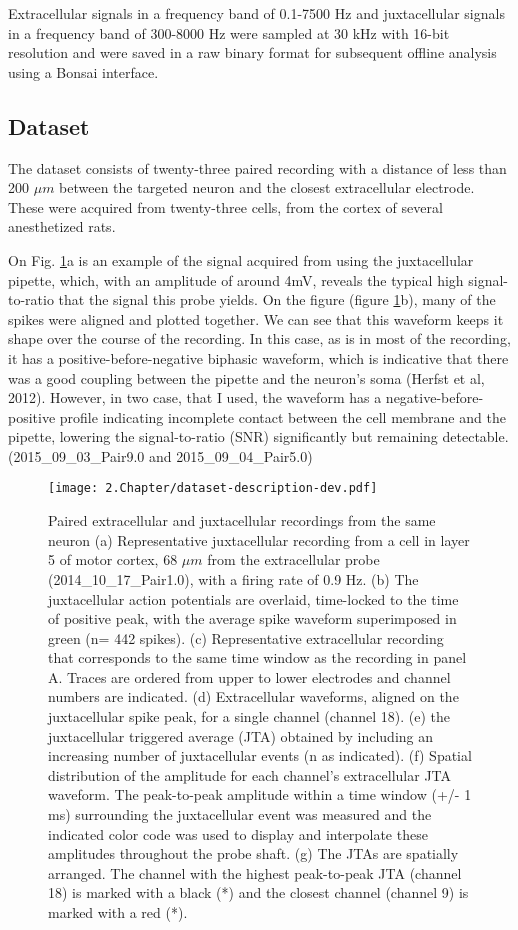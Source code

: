 Extracellular signals in a frequency band of 0.1-7500 Hz and juxtacellular signals in a frequency band of 300-8000 Hz were sampled at 30 kHz with 16-bit resolution and were saved in a raw binary format for subsequent offline analysis using a Bonsai interface.


\subsection{Dataset}
\label{subsec:Netodataset}
The dataset consists of twenty-three paired recording with a distance of less than 200 $\mu m$ between the targeted neuron and the closest extracellular electrode. These were acquired from twenty-three cells, from the cortex of several anesthetized rats.

On Fig. \ref{fig:neto-data-description}a is an example of the signal acquired from using the juxtacellular pipette, which, with an amplitude of around 4mV, reveals the typical high signal-to-ratio that the signal this probe yields. On the figure (figure \ref{fig:neto-data-description}b), many of the spikes were aligned and  plotted together. We can see that this waveform keeps it shape over the course of the recording. In this case, as is in most of the recording, it has a positive-before-negative biphasic waveform, which is indicative that there was a good coupling between the pipette and the neuron's soma (Herfst et al, 2012). However, in two case, that I used, the waveform has a negative-before-positive profile indicating incomplete contact between the cell membrane and the pipette, lowering the signal-to-ratio (SNR) significantly but remaining detectable. (2015\_09\_03\_Pair9.0 and 2015\_09\_04\_Pair5.0)

\begin{figure}[!h]
	\centering
	\texttt{[image: 2.Chapter/dataset-description-dev.pdf]}
	\caption{Paired extracellular and juxtacellular recordings from the same neuron
(a) Representative juxtacellular recording from a cell in layer 5 of motor cortex, 68 $\mu m$ from the extracellular probe (2014\_10\_17\_Pair1.0), with a firing rate of 0.9 Hz. (b) The juxtacellular action potentials are overlaid, time-locked to the time of positive peak, with the average spike waveform superimposed in green (n= 442 spikes). (c) Representative extracellular recording that corresponds to the same time window as the recording in panel A. Traces are ordered from upper to lower electrodes and channel numbers are indicated. (d) Extracellular waveforms, aligned on the juxtacellular spike peak, for a single channel (channel 18). (e) the juxtacellular triggered average (JTA) obtained by including an increasing number of juxtacellular events (n as indicated). (f) Spatial distribution of the amplitude for each channel’s extracellular JTA waveform. The peak-to-peak amplitude within a time window (+/- 1 ms) surrounding the juxtacellular event was measured and the indicated color code was used to display and interpolate these amplitudes throughout the probe shaft. (g) The JTAs are spatially arranged. The channel with the highest peak-to-peak JTA (channel 18) is marked with a black (*) and the closest channel (channel 9) is marked with a red (*).
}
\label{fig:neto-data-description}
\end{figure}

